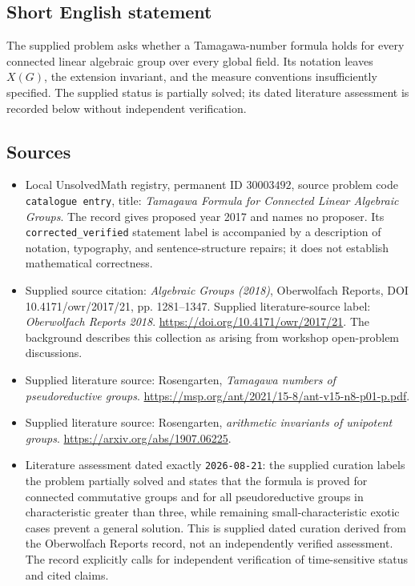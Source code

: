 \documentclass[11pt]{article}
\begin{document}
\subsection{Short English statement}
The supplied problem asks whether a Tamagawa-number formula holds for every connected linear algebraic group over every global field. Its notation leaves \(X(G)\), the extension invariant, and the measure conventions insufficiently specified. The supplied status is partially solved; its dated literature assessment is recorded below without independent verification.
\subsection{Sources}
\begin{itemize}
\item Local UnsolvedMath registry, permanent ID \(30003492\), source problem code \texttt{catalogue entry}, title: \emph{Tamagawa Formula for Connected Linear Algebraic Groups}. The record gives proposed year 2017 and names no proposer. Its \texttt{corrected\_verified} statement label is accompanied by a description of notation, typography, and sentence-structure repairs; it does not establish mathematical correctness.
\item Supplied source citation: \emph{Algebraic Groups (2018)}, Oberwolfach Reports, DOI 10.4171/owr/2017/21, pp. 1281--1347. Supplied literature-source label: \emph{Oberwolfach Reports 2018}. \url{https://doi.org/10.4171/owr/2017/21}. The background describes this collection as arising from workshop open-problem discussions.
\item Supplied literature source: Rosengarten, \emph{Tamagawa numbers of pseudoreductive groups}. \url{https://msp.org/ant/2021/15-8/ant-v15-n8-p01-p.pdf}.
\item Supplied literature source: Rosengarten, \emph{arithmetic invariants of unipotent groups}. \url{https://arxiv.org/abs/1907.06225}.
\item Literature assessment dated exactly \texttt{2026-08-21}: the supplied curation labels the problem partially solved and states that the formula is proved for connected commutative groups and for all pseudoreductive groups in characteristic greater than three, while remaining small-characteristic exotic cases prevent a general solution. This is supplied dated curation derived from the Oberwolfach Reports record, not an independently verified assessment. The record explicitly calls for independent verification of time-sensitive status and cited claims.
\end{itemize}
\end{document}
